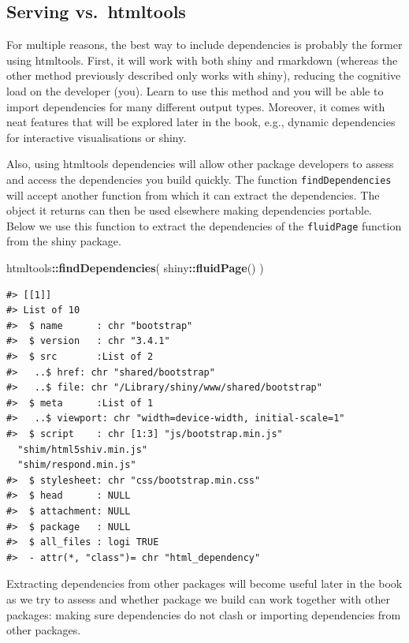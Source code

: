 \documentclass[10pt,]{krantz}
\makeatletter
\newenvironment{Shaded}{\begin{snugshade}}{\end{snugshade}}
\newcommand{\KeywordTok}[1]{\textcolor[rgb]{0.27,0.27,0.27}{\textbf{#1}}}
\newcommand{\NormalTok}[1]{#1}
\newcommand{\OperatorTok}[1]{\textcolor[rgb]{0.43,0.43,0.43}{\textbf{#1}}}
\newenvironment{kframe}{%
\medskip{}
\setlength{\fboxsep}{.8em}
 \def\at@end@of@kframe{}%
 \ifinner\ifhmode%
  \def\at@end@of@kframe{\end{minipage}}%
  \begin{minipage}{\columnwidth}%
 \fi\fi%
 \def\FrameCommand##1{\hskip\@totalleftmargin \hskip-\fboxsep
 \colorbox{shadecolor}{##1}\hskip-\fboxsep
     \hskip-\linewidth \hskip-\@totalleftmargin \hskip\columnwidth}%
 \MakeFramed {\advance\hsize-\width
   \@totalleftmargin\z@ \linewidth\hsize
   \@setminipage}}%
 {\par\unskip\endMakeFramed%
 \at@end@of@kframe}
\renewenvironment{Shaded}{\begin{kframe}}{\end{kframe}}
\makeatother
\begin{document}
\hypertarget{basics-deps-pro-cons}{%
\subsection{Serving vs.~htmltools}\label{basics-deps-pro-cons}}

For multiple reasons, the best way to include dependencies is probably the former using htmltools. First, it will work with both shiny and rmarkdown \citep{R-rmarkdown} (whereas the other method previously described only works with shiny), reducing the cognitive load on the developer (you). Learn to use this method and you will be able to import dependencies for many different output types. Moreover, it comes with neat features that will be explored later in the book, e.g., dynamic dependencies for interactive visualisations or shiny.

Also, using htmltools dependencies will allow other package developers to assess and access the dependencies you build quickly. The function \texttt{findDependencies} will accept another function from which it can extract the dependencies. The object it returns can then be used elsewhere making dependencies portable. Below we use this function to extract the dependencies of the \texttt{fluidPage} function from the shiny package.

\begin{Shaded}
\begin{Highlighting}[]
\NormalTok{htmltools}\OperatorTok{::}\KeywordTok{findDependencies}\NormalTok{(}
\NormalTok{  shiny}\OperatorTok{::}\KeywordTok{fluidPage}\NormalTok{()}
\NormalTok{) }
\end{Highlighting}
\end{Shaded}

\begin{verbatim}
#> [[1]]
#> List of 10
#>  $ name      : chr "bootstrap"
#>  $ version   : chr "3.4.1"
#>  $ src       :List of 2
#>   ..$ href: chr "shared/bootstrap"
#>   ..$ file: chr "/Library/shiny/www/shared/bootstrap"
#>  $ meta      :List of 1
#>   ..$ viewport: chr "width=device-width, initial-scale=1"
#>  $ script    : chr [1:3] "js/bootstrap.min.js" 
  "shim/html5shiv.min.js" 
  "shim/respond.min.js"
#>  $ stylesheet: chr "css/bootstrap.min.css"
#>  $ head      : NULL
#>  $ attachment: NULL
#>  $ package   : NULL
#>  $ all_files : logi TRUE
#>  - attr(*, "class")= chr "html_dependency"
\end{verbatim}

Extracting dependencies from other packages will become useful later in the book as we try to assess and whether package we build can work together with other packages: making sure dependencies do not clash or importing dependencies from other packages.
\end{document}
